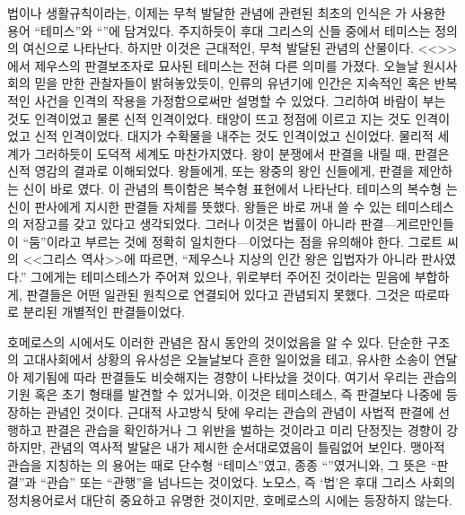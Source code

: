 법이나 생활규칙이라는, 이제는 무척 발달한 관념에 관련된 최초의 인식은
가 사용한 용어 ``테미스''와
``''에 담겨있다.
주지하듯이 후대 그리스의 신들 중에서 테미스는 정의의 여신으로 나타난다.
하지만 이것은 근대적인, 무척 발달된 관념의 산물이다.
<<>>에서 제우스의 판결보조자로 묘사된 테미스는 전혀 다른 의미를 가졌다.
오늘날 원시사회의 믿을 만한 관찰자들이 밝혀놓았듯이,
인류의 유년기에 인간은
지속적인 혹은 반복적인 사건을
인격의 작용을 가정함으로써만
설명할 수 있었다.
그리하여 바람이 부는 것도 인격이었고 물론 신적 인격이었다.
태양이 뜨고 정점에 이르고 지는 것도 인격이었고 신적 인격이었다.
대지가 수확물을 내주는 것도 인격이었고 신이었다.
물리적 세계가 그러하듯이 도덕적 세계도 마찬가지였다.
왕이 분쟁에서 판결을 내릴 때, 판결은 신적 영감의 결과로 이해되었다.
왕들에게, 또는 왕중의 왕인 신들에게, 판결을 제안하는 신이
바로 였다.
이 관념의 특이함은 복수형 표현에서 나타난다.
테미스의 복수형 는 신이 판사에게 지시한
판결들 자체를 뜻했다.
왕들은 바로 꺼내 쓸 수 있는 테미스테스의 저장고를 갖고 있다고 생각되었다.
그러나 이것은 법률이 아니라
판결---게르만인들이 ``둠''이라고 부르는 것에 정확히 일치한다---이었다는
점을 유의해야 한다.
그로트 씨의 <<그리스 역사>>에 따르면,
``제우스나 지상의 인간 왕은 입법자가 아니라 판사였다.''
그에게는 테미스테스가 주어져 있으나,
위로부터 주어진 것이라는 믿음에 부합하게,
판결들은 어떤 일관된 원칙으로 연결되어 있다고 관념되지 못했다.
그것은 따로따로 분리된 개별적인 판결들이었다.

호메로스의 시에서도 이러한 관념은 잠시 동안의 것이었음을 알 수 있다.
단순한 구조의 고대사회에서 상황의 유사성은 오늘날보다 흔한 일이었을 테고,
유사한 소송이 연달아 제기됨에 따라 판결들도 비슷해지는 경향이 나타났을 것이다.
여기서 우리는 관습의 기원 혹은 초기 형태를 발견할 수 있거니와,
이것은 테미스테스, 즉 판결보다 나중에 등장하는 관념인 것이다.
근대적 사고방식 탓에 우리는 관습의 관념이 사법적 판결에 선행하고
판결은 관습을 확인하거나 그 위반을 벌하는 것이라고 미리 단정짓는
경향이 강하지만, 관념의 역사적 발달은 내가 제시한 순서대로였음이
틀림없어 보인다.
맹아적 관습을 지칭하는 의 용어는 때로 단수형 ``테미스''였고,
종종 ``''였거니와, 그 뜻은 ``판결''과 ``관습'' 또는
``관행''을 넘나드는 것이었다.
노모스, 즉 `법'은 후대 그리스 사회의 정치용어로서 대단히 중요하고
유명한 것이지만, 호메로스의 시에는 등장하지 않는다.

